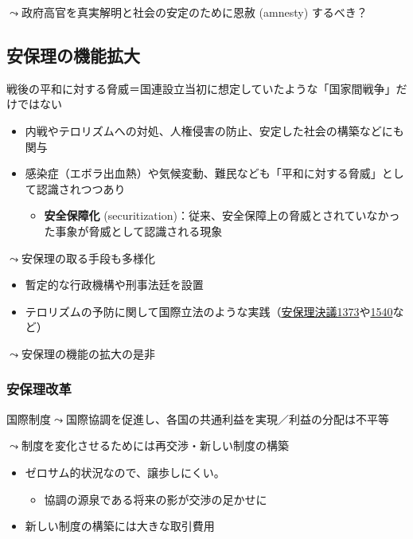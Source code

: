 \documentclass[
  xelatex,
  ja=standard]{bxjsarticle}
\providecommand{\tightlist}{%
  \setlength{\itemsep}{0pt}\setlength{\parskip}{0pt}}\usepackage{longtable,booktabs,array}
\begin{document}
\(\leadsto\)政府高官を真実解明と社会の安定のために恩赦 (amnesty)
するべき？

\hypertarget{ux5b89ux4fddux7406ux306eux6a5fux80fdux62e1ux5927}{%
\subsection{安保理の機能拡大}\label{ux5b89ux4fddux7406ux306eux6a5fux80fdux62e1ux5927}}

戦後の平和に対する脅威＝国連設立当初に想定していたような「国家間戦争」だけではない

\begin{itemize}
\tightlist
\item
  内戦やテロリズムへの対処、人権侵害の防止、安定した社会の構築などにも関与
\item
  感染症（エボラ出血熱）や気候変動、難民なども「平和に対する脅威」として認識されつつあり

  \begin{itemize}
  \tightlist
  \item
    \textbf{安全保障化}
    (securitization)：従来、安全保障上の脅威とされていなかった事象が脅威として認識される現象
  \end{itemize}
\end{itemize}

\(\leadsto\)安保理の取る手段も多様化

\begin{itemize}
\tightlist
\item
  暫定的な行政機構や刑事法廷を設置
\item
  テロリズムの予防に関して国際立法のような実践（\href{https://www.unic.or.jp/news_press/features_backgrounders/1271/}{安保理決議1373}や\href{https://www.jaea.go.jp/04/iscn/archive/pocketbook/pocketbook07-04.pdf}{1540}など）
\end{itemize}

\(\leadsto\)安保理の機能の拡大の是非

\hypertarget{ux5b89ux4fddux7406ux6539ux9769}{%
\subsubsection{安保理改革}\label{ux5b89ux4fddux7406ux6539ux9769}}

国際制度\(\leadsto\)国際協調を促進し、各国の共通利益を実現／利益の分配は不平等

\(\leadsto\)制度を変化させるためには再交渉・新しい制度の構築

\begin{itemize}
\tightlist
\item
  ゼロサム的状況なので、譲歩しにくい。

  \begin{itemize}
  \tightlist
  \item
    協調の源泉である将来の影が交渉の足かせに\citep{fearon1998}
  \end{itemize}
\item
  新しい制度の構築には大きな取引費用
\end{itemize}
\end{document}
